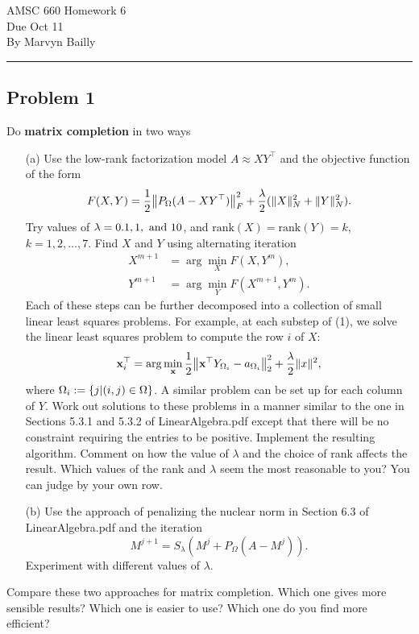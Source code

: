 \documentclass[12pt]{report}
\begin{document}
\large
\begin{center}
AMSC 660 Homework 6\\
Due Oct 11\\
By Marvyn Bailly\\
\end{center}
\normalsize
\hrule



\begin{problem}%
\subsection*{Problem 1}

Do \textbf{matrix completion} in two ways
\begin{enumerate}
    \item [(a)]
    Use the low-rank factorization model $A \approx XY^\top$ and the objective function of the form
    \[
         F(X,Y) = \frac{1}{2}{\left\|P_\Omega(A - XY^\top)\right\|}_F^2 + \frac{\lambda}{2}(\|X\|_N^2 + \|Y\|_N^2).
    \]
    Try values of $\lambda = 0.1, 1, {~\text{and}~} 10$, and $\text{rank}(X) = \text{rank}(Y) = k$, $k=1,2,\dots,7$. Find $X$ and $Y$ using alternating iteration
    \begin{align*}
        X^{m+1} &= \arg \min_X F(X,Y^m),\\
        Y^{m+1} &= \arg \min_Y F(X^{m+1},Y^m).
    \end{align*}
    Each of these steps can be further decomposed into a collection of small linear least squares problems. For example, at each substep of (1), we solve the linear least squares problem to compute the row $i$ of $X$:
    \[
        \mathbf{x}_i^\top = \arg \min_\mathbf{x}\frac{1}{2}{\left\|\mathbf{x}^\top Y_{\Omega_i} - a_{\Omega_i}\right\|}_2^2 + \frac{\lambda}{2}\|x\|^2,
    \]
    where $\Omega_i := {\left\{j | (i,j) \in \Omega\right\}}$. A similar problem can be set up for each column of $Y$. Work out solutions to these problems in a manner similar to the one in Sections 5.3.1 and 5.3.2 of LinearAlgebra.pdf except that there will be no constraint requiring the entries to be positive. Implement the resulting algorithm. Comment on how the value of $\lambda$ and the choice of rank affects the result. Which values of the rank and $\lambda$ seem the most reasonable to you? You can judge by your own row.

    \item [(b)] Use the approach of penalizing the nuclear norm in Section 6.3 of LinearAlgebra.pdf and the iteration
    \[
         M^{j+1} = S_\lambda (M^j + P_\Omega(A - M^j)).
    \]
    Experiment with different values of $\lambda$.  
\end{enumerate} 
Compare these two approaches for matrix completion. Which one gives more sensible
results? Which one is easier to use? Which one do you find more efficient?




\end{problem}
\end{document}
